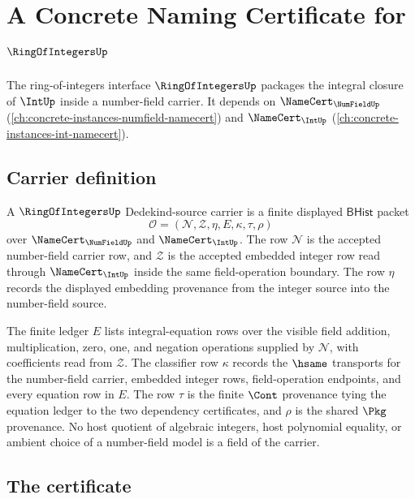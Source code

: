 \chapter{A Concrete Naming Certificate for $\RingOfIntegersUp$}
\label{ch:concrete-instances-ringofintegers-namecert}

The ring-of-integers interface $\RingOfIntegersUp$ packages the integral closure of $\IntUp$ inside a number-field carrier. It depends on $\NameCert_{\NumFieldUp}$ (\autoref{ch:concrete-instances-numfield-namecert}) and $\NameCert_{\IntUp}$ (\autoref{ch:concrete-instances-int-namecert}).

\section{Carrier definition}
\label{sec:ringofintegers-carrier}

\begin{definition}\label{def:ringofintegers-dedekind-source-carrier}
A $\RingOfIntegersUp$ Dedekind-source carrier is a finite displayed
$\mathsf{BHist}$ packet
$$
\mathcal O=(\mathcal N,\mathcal Z,\eta,E,\kappa,\tau,\rho)
$$
over $\NameCert_{\NumFieldUp}$ and $\NameCert_{\IntUp}$. The row
$\mathcal N$ is the accepted number-field carrier row, and $\mathcal Z$ is the
accepted embedded integer row read through $\NameCert_{\IntUp}$ inside the same
field-operation boundary. The row $\eta$ records the displayed embedding
provenance from the integer source into the number-field source.

The finite ledger $E$ lists integral-equation rows over the visible field
addition, multiplication, zero, one, and negation operations supplied by
$\mathcal N$, with coefficients read from $\mathcal Z$. The classifier row
$\kappa$ records the $\hsame$ transports for the number-field carrier, embedded
integer rows, field-operation endpoints, and every equation row in $E$. The row
$\tau$ is the finite $\Cont$ provenance tying the equation ledger to the two
dependency certificates, and $\rho$ is the shared $\Pkg$ provenance. No host
quotient of algebraic integers, host polynomial equality, or ambient choice of a
number-field model is a field of the carrier.
\end{definition}

\section{The certificate}
\label{sec:ringofintegers-certificate}

